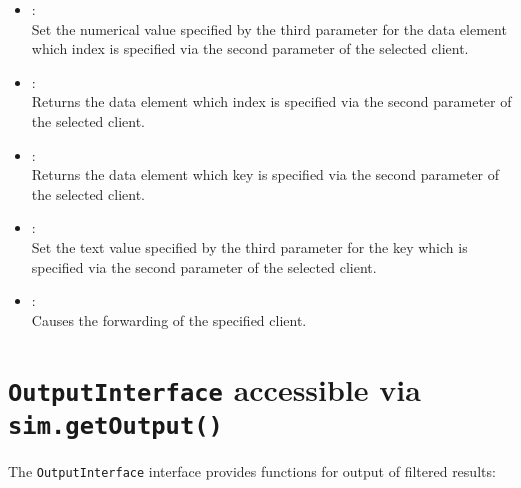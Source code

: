 \begin{itemize}
\item
{}:\\
Set the numerical value specified by the third parameter for the data element which index is specified via the second parameter of the selected client.

\item
{}:\\
Returns the data element which index is specified via the second parameter of the selected client.

\item
{}:\\
Returns the data element which key is specified via the second parameter of the selected client.

\item
{}:\\
Set the text value specified by the third parameter for the key which is specified via the second parameter of the selected client.

\item
{}:\\
Causes the forwarding of the specified client.

\end{itemize}


\chapter{\texttt{OutputInterface} accessible via \texttt{sim.getOutput()}}

The \texttt{OutputInterface} interface provides functions for output of filtered results:

